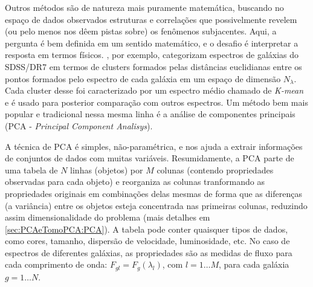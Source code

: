 Outros métodos são de natureza mais puramente matemática, buscando no espaço de dados observados estruturas e
correlações que possivelmente revelem (ou pelo menos nos dêem pistas sobre) os fenômenos subjacentes. Aqui, a pergunta é
bem definida em um sentido matemático, e o desafio é interpretar a resposta em termos físicos.
\citet{SanchezAlmeida2010}, por exemplo, categorizam espectros de galáxias do SDSS/DR7 em termos de clusters formados
pelas distâncias euclidianas entre os pontos formados pelo espectro de cada galáxia em um espaço de dimensão
$N_\lambda$. Cada cluster desse foi caracterizado por um espectro médio chamado de {\em K-mean} e é usado para posterior
comparação com outros espectros. Um método bem mais popular e tradicional nessa mesma linha é a análise de componentes
principais (PCA - {\em Principal Component Analisys}).

A técnica de PCA é simples, não-paramétrica, e nos ajuda a extrair informações de conjuntos de dados com muitas
variáveis. Resumidamente, a PCA parte de uma tabela de $N$ linhas (objetos) por $M$ colunas (contendo propriedades
observadas para cada objeto) e reorganiza as colunas tranformando as propriedades originais em combinações delas mesmas
de forma que as diferenças (a variância) entre os objetos  esteja concentrada nas primeiras colunas, reduzindo assim
dimensionalidade do problema (mais detalhes em \ref{sec:PCAeTomoPCA:PCA}). A tabela pode conter quaisquer tipos de
dados, como cores, tamanho, dispersão de velocidade, luminosidade, etc. No caso de espectros de diferentes galáxias, as
propriedades são as medidas de fluxo para cada comprimento de onda: $F_{gl} = F_g(\lambda_l)$, com $l = 1 \ldots M$,
para cada galáxia $g = 1 \ldots N$.

